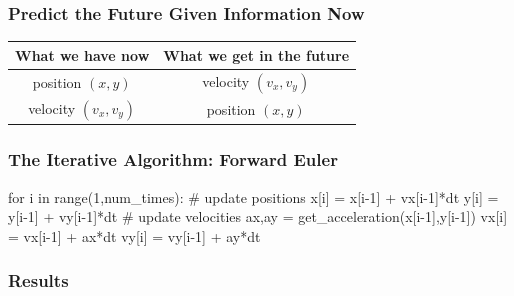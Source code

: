 \documentclass[]{beamer}
\begin{document}
\begin{frame}
  \frametitle{Predict the Future Given Information Now}
  \begin{Large}
  \begin{center}
    \begin{tabular}{c | c}
      What we have now & What we get in the future \\
      \hline
      position $(x,y)$ & velocity $(v_x,v_y)$ \\ 
      [1ex]
      velocity $(v_x,v_y)$ & position $(x,y)$
    \end{tabular}
  \end{center}
\end{Large}
\end{frame}

\begin{frame}[fragile]
  \frametitle{The Iterative Algorithm: Forward Euler}
\begin{python}
for i in range(1,num_times):
    # update positions
    x[i] = x[i-1] + vx[i-1]*dt
    y[i] = y[i-1] + vy[i-1]*dt
    # update velocities
    ax,ay = get_acceleration(x[i-1],y[i-1])
    vx[i] = vx[i-1] + ax*dt
    vy[i] = vy[i-1] + ay*dt
\end{python}
\end{frame}

\begin{frame}
  \frametitle{Results}
  \begin{columns}
    \column{6cm}
    \begin{center}
    \end{center}
    \column{6cm}
    \begin{center}
    \end{center}
  \end{columns}
\end{frame}
\end{document}
